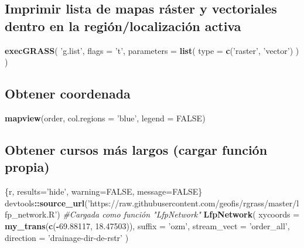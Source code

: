 \documentclass[11pt,]{article}
\newenvironment{Shaded}{\begin{snugshade}}{\end{snugshade}}
\newcommand{\KeywordTok}[1]{\textcolor[rgb]{0.13,0.29,0.53}{\textbf{#1}}}
\newcommand{\DataTypeTok}[1]{\textcolor[rgb]{0.13,0.29,0.53}{#1}}
\newcommand{\FloatTok}[1]{\textcolor[rgb]{0.00,0.00,0.81}{#1}}
\newcommand{\StringTok}[1]{\textcolor[rgb]{0.31,0.60,0.02}{#1}}
\newcommand{\CommentTok}[1]{\textcolor[rgb]{0.56,0.35,0.01}{\textit{#1}}}
\newcommand{\OtherTok}[1]{\textcolor[rgb]{0.56,0.35,0.01}{#1}}
\newcommand{\OperatorTok}[1]{\textcolor[rgb]{0.81,0.36,0.00}{\textbf{#1}}}
\newcommand{\NormalTok}[1]{#1}
\begin{document}
\subsection{Imprimir lista de mapas ráster y vectoriales dentro en la
región/localización
activa}\label{imprimir-lista-de-mapas-ruxe1ster-y-vectoriales-dentro-en-la-regiuxf3nlocalizaciuxf3n-activa-1}

\begin{Shaded}
\begin{Highlighting}[]
\KeywordTok{execGRASS}\NormalTok{(}
  \StringTok{'g.list'}\NormalTok{,}
  \DataTypeTok{flags =} \StringTok{'t'}\NormalTok{,}
  \DataTypeTok{parameters =} \KeywordTok{list}\NormalTok{(}
    \DataTypeTok{type =} \KeywordTok{c}\NormalTok{(}\StringTok{'raster'}\NormalTok{, }\StringTok{'vector'}\NormalTok{)}
\NormalTok{  )}
\NormalTok{)}
\end{Highlighting}
\end{Shaded}

\subsection{Obtener coordenada}\label{obtener-coordenada}

\begin{Shaded}
\begin{Highlighting}[]
\KeywordTok{mapview}\NormalTok{(order, }\DataTypeTok{col.regions =} \StringTok{'blue'}\NormalTok{, }\DataTypeTok{legend =} \OtherTok{FALSE}\NormalTok{)}
\end{Highlighting}
\end{Shaded}

\subsection{Obtener cursos más largos (cargar función
propia)}\label{obtener-cursos-muxe1s-largos-cargar-funciuxf3n-propia}

\begin{Shaded}
\begin{Highlighting}[]
\NormalTok{   \{r, results=}\StringTok{'hide'}\NormalTok{, warning=}\OtherTok{FALSE}\NormalTok{, message=}\OtherTok{FALSE}\NormalTok{\}}
\NormalTok{devtools}\OperatorTok{::}\KeywordTok{source_url}\NormalTok{(}\StringTok{'https://raw.githubusercontent.com/geofis/rgrass/master/lfp_network.R'}\NormalTok{) }\CommentTok{#Cargada como función "LfpNetwork"}
\KeywordTok{LfpNetwork}\NormalTok{(}
  \DataTypeTok{xycoords =} \KeywordTok{my_trans}\NormalTok{(}\KeywordTok{c}\NormalTok{(}\OperatorTok{-}\FloatTok{69.88117}\NormalTok{, }\FloatTok{18.47503}\NormalTok{)),}
  \DataTypeTok{suffix =} \StringTok{'ozm'}\NormalTok{,}
  \DataTypeTok{stream_vect =} \StringTok{'order_all'}\NormalTok{,}
  \DataTypeTok{direction =} \StringTok{'drainage-dir-de-rstr'}
\NormalTok{)}
\end{Highlighting}
\end{Shaded}
\end{document}
